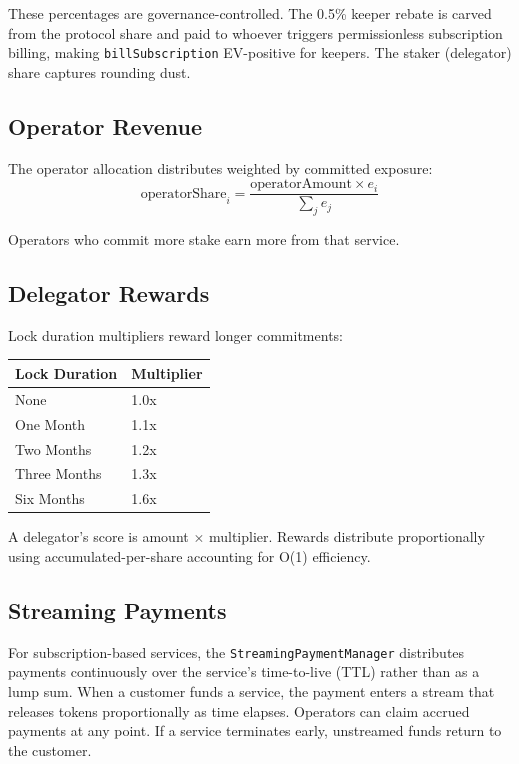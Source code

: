 \documentclass[11pt,a4paper]{article}
\begin{document}
These percentages are governance-controlled. The 0.5\% keeper rebate is carved from the protocol share and paid to whoever triggers permissionless subscription billing, making \texttt{billSubscription} EV-positive for keepers. The staker (delegator) share captures rounding dust.

\subsection{Operator Revenue}

The operator allocation distributes weighted by committed exposure:
\[
\text{operatorShare}_i = \frac{\text{operatorAmount} \times e_i}{\sum_j e_j}
\]

Operators who commit more stake earn more from that service.

\subsection{Delegator Rewards}

Lock duration multipliers reward longer commitments:
\begin{center}
\begin{tabular}{ll}
\toprule
Lock Duration & Multiplier \\
\midrule
None & 1.0x \\
One Month & 1.1x \\
Two Months & 1.2x \\
Three Months & 1.3x \\
Six Months & 1.6x \\
\bottomrule
\end{tabular}
\end{center}

A delegator's score is amount $\times$ multiplier. Rewards distribute proportionally using accumulated-per-share accounting for O(1) efficiency.

\subsection{Streaming Payments}

For subscription-based services, the \texttt{StreamingPaymentManager} distributes payments continuously over the service's time-to-live (TTL) rather than as a lump sum. When a customer funds a service, the payment enters a stream that releases tokens proportionally as time elapses. Operators can claim accrued payments at any point. If a service terminates early, unstreamed funds return to the customer.
\end{document}
